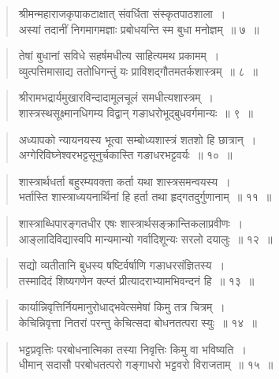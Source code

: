 {\begin{verse}
श्रीमन्महाराजकृपाकटाक्षात् संवर्धिता संस्कृतपाठशाला~।\\
अस्यां तदानीं निगमागमज्ञाः प्रबोधयन्ति स्म बुधा मनोज्ञम्~॥ ७~॥
\end{verse}

\begin{verse}
तेषां बुधानां सविधे सहर्षमधीत्य साहित्यमथ प्रकामम्~।\\
व्युत्पत्तिमासाद्य ततोधिगन्तुं यः प्राविशद्गौतमतर्कशास्त्रम्~॥ ८~॥
\end{verse}

\begin{verse}
श्रीरामभद्रार्यमुखारविन्दादामूलचूलं समधीत्यशास्त्रम्~।\\
शास्त्रस्थसूक्ष्मानधिगम्य विद्वान् गङाधरोभूद्बुधवर्गमान्यः~॥ ९~॥
\end{verse}

\begin{verse}
अध्यापको न्यायनयस्य भूत्वा सम्बोध्यशास्त्रं शतशो हि छात्रान्~।\\
अग्गेरिविघ्नेश्वरभट्टसूनुर्चकास्ति गङाधरभट्टवर्यः~॥ १०~॥
\end{verse}

\begin{verse}
शास्त्रार्थधर्ता बहुरम्यवक्ता कर्ता यथा शास्त्रसमन्वयस्य~।\\
भर्तास्ति शास्त्राध्ययनार्थिनां हि हर्ता तथा हृद्गतदुर्गुणानाम्~॥ ११~॥
\end{verse}

\begin{verse}
शास्त्राब्धिपारङ्गतधीर एषः शास्त्रार्थसङ्क्रान्तिकलाप्रवीणः~।\\
आङ्लादिविद्यास्वपि मान्यमान्यो गर्वादिशून्यः सरलो दयालुः~॥ १२~॥
\end{verse}

\begin{verse}
सद्यो व्यतीतानि बुधस्य षष्टिर्वर्षाणि गङाधरसंज्ञितस्य~।\\
तस्मादिदं शिष्यगणेन क्ल्प्तं प्रीत्यादराभ्यामभिवन्दनं हि~॥ १३~॥
\end{verse}

\begin{verse}
कार्यान्निवृत्तिर्नियमानुरोधाद्भवेत्समेषां किमु तत्र चित्रम्~।\\
केचिन्निवृत्ता नितरां परन्तु केचित्सदा बोधनतत्परा स्युः~॥ १४~॥
\end{verse}

\begin{verse}
भट्टप्रवृत्तिः परबोधनात्मिका तस्या निवृत्तिः किमु वा भविष्यति~।\\
धीमान् सदासौ परबोधतत्परो गङ्गाधरो भट्टवरो विराजताम्~॥ १५~॥
\end{verse}

}
